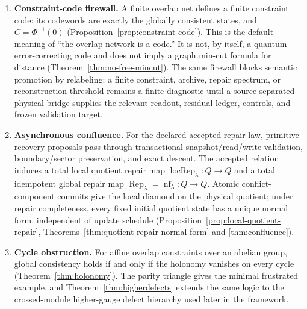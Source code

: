 \documentclass[11pt]{article}
\theoremstyle{remark}
\theoremstyle{plain}
\begin{document}
\begin{enumerate}
\item \textbf{Constraint-code firewall.} A finite overlap net defines a finite constraint code:
its codewords are exactly the globally consistent states, and \(C=\Phi^{-1}(0)\)
(Proposition~\ref{prop:constraint-code}). This is the default meaning of ``the overlap network is
a code.'' It is not, by itself, a quantum error-correcting code and does not imply a graph
min-cut formula for distance (Theorem~\ref{thm:no-free-mincut}). The same firewall blocks semantic
promotion by relabeling: a finite constraint, archive, repair spectrum, or reconstruction threshold
remains a finite diagnostic until a source-separated physical bridge supplies the relevant readout,
residual ledger, controls, and frozen validation target.
\item \textbf{Asynchronous confluence.} For the declared accepted repair law, primitive recovery proposals pass through transactional snapshot/read/write validation, boundary/sector preservation, and exact descent. The accepted relation induces a total local quotient repair map \(\operatorname{locRep}_\lambda:Q\to Q\) and a total idempotent global repair map \(\operatorname{Rep}_\lambda=\overline{\operatorname{nf}}_\lambda:Q\to Q\). Atomic conflict-component commits give the local diamond on the physical quotient; under repair completeness, every fixed initial quotient state has a unique normal form, independent of update schedule (Proposition~\ref{prop:local-quotient-repair}, Theorems~\ref{thm:quotient-repair-normal-form} and \ref{thm:confluence}).
\item \textbf{Cycle obstruction.} For affine overlap constraints over an abelian group, global consistency holds if and only if the holonomy vanishes on every cycle (Theorem~\ref{thm:holonomy}). The parity triangle gives the minimal frustrated example, and Theorem~\ref{thm:higherdefects} extends the same logic to the crossed-module higher-gauge defect hierarchy used later in the framework.

\end{enumerate}
\end{document}
